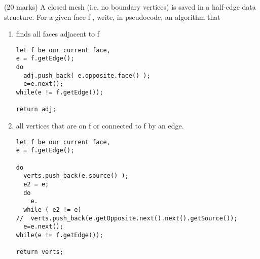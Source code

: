 (20 marks) A closed mesh (i.e. no boundary vertices) is saved in a half-edge data structure. For a given face f , write, in pseudocode, an algorithm that

\begin{enumerate}
\item finds all faces adjacent to f
\begin{verbatim}
let f be our current face,
e = f.getEdge();
do
  adj.push_back( e.opposite.face() );
  e=e.next();
while(e != f.getEdge());

return adj;
\end{verbatim}
\item all vertices that are on f or connected to f by an edge.
\begin{verbatim}
let f be our current face,
e = f.getEdge();

do
  verts.push_back(e.source() );
  e2 = e;
  do
    e.
  while ( e2 != e)
//  verts.push_back(e.getOpposite.next().next().getSource());
  e=e.next();
while(e != f.getEdge());

return verts;
\end{verbatim}

\end{enumerate}
